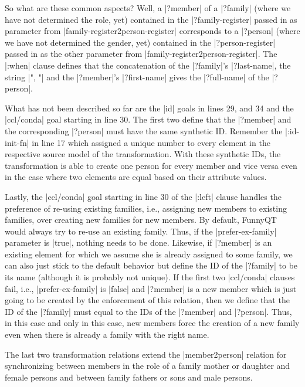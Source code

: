 \documentclass[a4paper]{article}
\newcommand{\code}{\clojureinline}
\begin{document}
So what are these common aspects?  Well, a \code|?member| of a \code|?family|
(where we have not determined the role, yet) contained in the
\code|?family-register| passed in as parameter from
\code|family-register2person-register| corresponds to a \code|?person| (where
we have not determined the gender, yet) contained in the
\code|?person-register| passed in as the other parameter from
\code|family-register2person-register|.  The \code|:when| clause defines that
the concatenation of the \code|?family|'s \code|?last-name|, the string
\code|", "| and the \code|?member|'s \code|?first-name| gives the
\code|?full-name| of the \code|?person|.

What has not been described so far are the \code|id| goals in lines 29, and 34
and the \code|ccl/conda| goal starting in line 30.  The first two define that
the \code|?member| and the corresponding \code|?person| must have the same
synthetic ID.  Remember the \code|:id-init-fn| in line 17 which assigned a
unique number to every element in the respective source model of the
transformation.  With these synthetic IDs, the transformation is able to create
one person for every member and vice versa even in the case where two elements
are equal based on their attribute values.

Lastly, the \code|ccl/conda| goal starting in line 30 of the \code|:left|
clause handles the preference of re-using existing families, i.e., assigning
new members to existing families, over creating new families for new members.
By default, FunnyQT would always try to re-use an existing family.  Thus, if
the \code|prefer-ex-family| parameter is \code|true|, nothing needs to be done.
Likewise, if \code|?member| is an existing element for which we assume she is
already assigned to some family, we can also just stick to the default behavior
but define the ID of the \code|?family| to be its name (although it is probably
not unique).  If the first two \code|ccl/conda| clauses fail, i.e.,
\code|prefer-ex-family| is \code|false| and \code|?member| is a new member
which is just going to be created by the enforcement of this relation, then we
define that the ID of the \code|?family| must equal to the IDs of the
\code|?member| and \code|?person|.  Thus, in this case and only in this case,
new members force the creation of a new family even when there is already a
family with the right name.

The last two transformation relations extend the \code|member2person| relation
for synchronizing between members in the role of a family mother or daughter
and female persons and between family fathers or sons and male persons.
\end{document}
